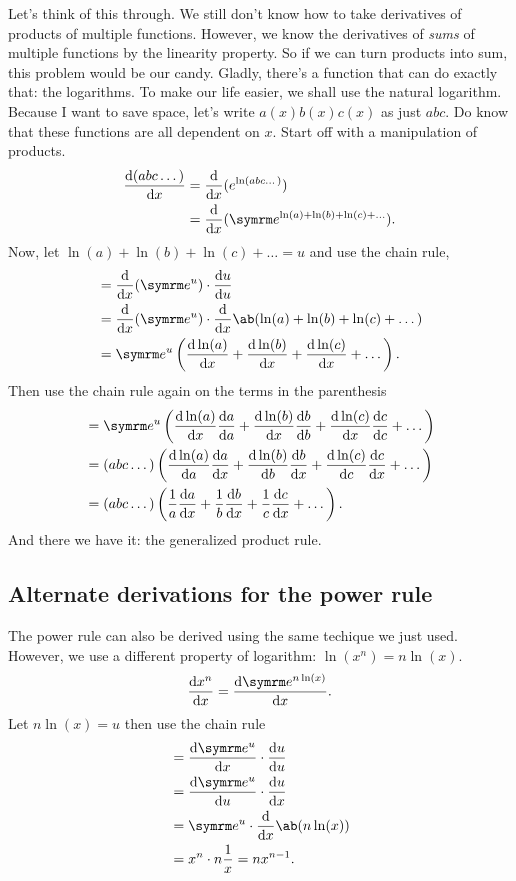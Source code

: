 Let's think of this through. We still don't know how to take derivatives of products of multiple functions. However, we know the derivatives of \emph{sums} of multiple functions by the linearity property. So if we can turn products into sum, this problem would be our candy. Gladly, there's a function that can do exactly that: the logarithms. To make our life easier, we shall use the natural logarithm. Because I want to save space, let's write $a(x)b(x)c(x)$ as just $abc$. Do know that these functions are all dependent on $x$. Start off with a manipulation of products.
\begin{align*}
    \odv{(abc\dots)}{x} &= \odv*{(e^{\ln(abc\dots)})}{x} \\
    &= \odv*{(\e^{\ln(a) + \ln(b) + \ln(c) + \dots})}{x}.
\end{align*}
Now, let $\ln(a) + \ln(b) + \ln(c) + \dots = u$ and use the chain rule,
\begin{align*}
    &= \odv*{(\e^u)}{x} \cdot \odv{u}{u} \\
    &= \odv*{(\e^u)}{x} \cdot \odv*{\ab(\ln(a) + \ln(b) + \ln(c) + \dots)}{x} \\
    &= \e^u \left(\odv{\ln(a)}{x} + \odv{\ln(b)}{x} + \odv{\ln(c)}{x} + \dots\right).
\end{align*}
Then use the chain rule again on the terms in the parenthesis
\begin{align*}
    &= \e^u \left(\odv{\ln(a)}{x}\odv{a}{a} + \odv{\ln(b)}{x}\odv{b}{b} + \odv{\ln(c)}{x}\odv{c}{c} + \dots\right) \\
    &= (abc\dots)\left(\odv{\ln(a)}{a}\odv{a}{x} + \odv{\ln(b)}{b}\odv{b}{x} + \odv{\ln(c)}{c}\odv{c}{x} + \dots\right) \\
    &= (abc\dots)\left(\frac{1}{a}\odv{a}{x} + \frac{1}{b}\odv{b}{x} + \frac{1}{c}\odv{c}{x} + \dots\right).
\end{align*}
And there we have it: the generalized product rule.

\subsection{Alternate derivations for the power rule}

The power rule can also be derived using the same techique we just used. However, we use a different property of logarithm: $\ln(x^n) = n\ln(x)$.
\begin{equation*}
    \odv{x^n}{x} = \odv{\e^{n\ln(x)}}{x}.
\end{equation*}
Let $n\ln(x) = u$ then use the chain rule
\begin{align*}
    &= \odv{\e^u}{x} \cdot \odv{u}{u} \\
    &= \odv{\e^u}{u} \cdot \odv{u}{x} \\
    &= \e^u \cdot \odv*{\ab(n\ln(x))}{x} \\
    &= x^n \cdot n\frac{1}{x} = nx^{n - 1}.
\end{align*}

